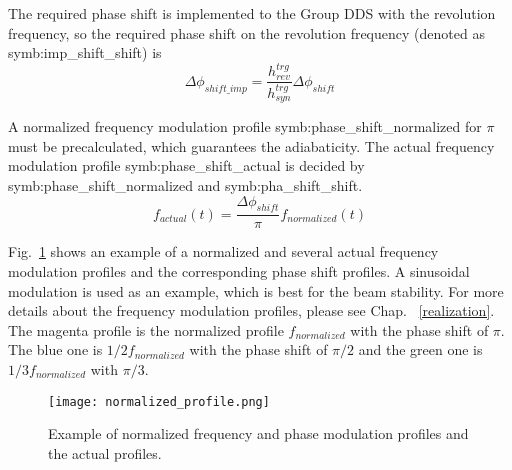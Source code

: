 The required phase shift is implemented to the Group DDS with the revolution frequency, so the required phase shift on the revolution frequency (denoted as \gls{symb:imp_shift_shift}) is 
\begin{equation}
\Delta \phi_\mathit{shift\_imp}= \frac{h_{\mathit{rev}}^{trg}}{h_{\mathit{syn}}^{trg}}\Delta \phi_\mathit{shift}
\end{equation}

A normalized frequency modulation profile \gls{symb:phase_shift_normalized} for $\pi$ must be precalculated, which guarantees the adiabaticity. The actual frequency modulation profile \gls{symb:phase_shift_actual} is decided by \gls{symb:phase_shift_normalized} and \gls{symb:pha_shift_shift}. 
\begin{equation}
f_{\mathit{actual}}(t)=\frac{\Delta \phi_\mathit{shift}}{\pi}f_{\mathit{normalized}}(t) \label{actual_profile}
\end{equation}
 

Fig.~\ref{normalized_profile} shows an example of a normalized and several actual frequency modulation profiles and the corresponding phase shift profiles. A sinusoidal modulation is used as an example, which is best for the beam stability. For more details about the frequency modulation profiles, please see Chap. ~\ref{realization}. The magenta profile is the normalized profile $f_{normalized}$ with the phase shift of $\pi$. The blue one is $1/2 f_{\mathit{normalized}}$ with the phase shift of $\pi/2$ and the green one is $1/3 f_{\mathit{normalized}}$ with $\pi/3$. 
\begin{figure}[H]
   \centering   
   \texttt{[image: normalized\_profile.png]}
   \caption{Example of normalized frequency and phase modulation profiles and the actual profiles.}
   \label{normalized_profile}
\end{figure} 


